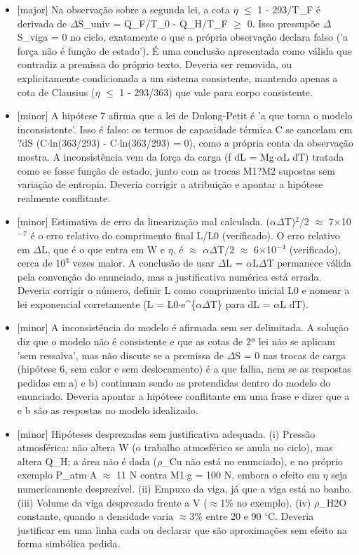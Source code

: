 \documentclass{article}%
\begin{document}
\begin{itemize}%
\item%
{[}major{]} Na observação sobre a segunda lei, a cota $\eta$ $\leq$ 1 - 293/T\_F é derivada de $\Delta$S\_univ = Q\_F/T\_0 - Q\_H/T\_F $\geq$ 0. Isso pressupõe $\Delta$S\_viga = 0 no ciclo, exatamente o que a própria observação declara falso ('a força não é função de estado'). É uma conclusão apresentada como válida que contradiz a premissa do próprio texto. Deveria ser removida, ou explicitamente condicionada a um sistema consistente, mantendo apenas a cota de Clausius ($\eta$ $\leq$ 1 - 293/363) que vale para corpo consistente.%
\item%
{[}minor{]} A hipótese 7 afirma que a lei de Dulong{-}Petit é 'a que torna o modelo inconsistente'. Isso é falso: os termos de capacidade térmica C se cancelam em ?dS (C$\cdot$ln(363/293) - C$\cdot$ln(363/293) = 0), como a própria conta da observação mostra. A inconsistência vem da força da carga (f dL = Mg$\cdot$$\alpha$L dT) tratada como se fosse função de estado, junto com as trocas M1?M2 supostas sem variação de entropia. Deveria corrigir a atribuição e apontar a hipótese realmente conflitante.%
\item%
{[}minor{]} Estimativa de erro da linearização mal calculada. ($\alpha$$\Delta$T)$^2$/2 $\approx$ 7$\times$10$^{-}$$^{7}$ é o erro relativo do comprimento final L/L0 (verificado). O erro relativo em $\Delta$L, que é o que entra em W e $\eta$, é $\approx$ $\alpha$$\Delta$T/2 $\approx$ 6$\times$10$^{-}$$^{4}$ (verificado), cerca de 10$^3$ vezes maior. A conclusão de usar $\Delta$L = $\alpha$L$\Delta$T permanece válida pela convenção do enunciado, mas a justificativa numérica está errada. Deveria corrigir o número, definir L como comprimento inicial L0 e nomear a lei exponencial corretamente (L = L0$\cdot$e\^{}\{$\alpha$$\Delta$T\} para dL = $\alpha$L dT).%
\item%
{[}minor{]} A inconsistência do modelo é afirmada sem ser delimitada. A solução diz que o modelo não é consistente e que as cotas de 2ª lei não se aplicam 'sem ressalva', mas não discute se a premissa de $\Delta$S = 0 nas trocas de carga (hipótese 6, sem calor e sem deslocamento) é a que falha, nem se as respostas pedidas em a) e b) continuam sendo as pretendidas dentro do modelo do enunciado. Deveria apontar a hipótese conflitante em uma frase e dizer que a e b são as respostas no modelo idealizado.%
\item%
{[}minor{]} Hipóteses desprezadas sem justificativa adequada. (i) Pressão atmosférica: não altera W (o trabalho atmosférico se anula no ciclo), mas altera Q\_H; a área não é dada ($\rho$\_Cu não está no enunciado), e no próprio exemplo P\_atm$\cdot$A $\approx$ 11 N contra M1$\cdot$g = 100 N, embora o efeito em $\eta$ seja numericamente desprezível. (ii) Empuxo da viga, já que a viga está no banho. (iii) Volume da viga desprezado frente a V ($\approx$1\% no exemplo). (iv) $\rho$\_H2O constante, quando a densidade varia $\approx$3\% entre 20 e 90 $^\circ$C. Deveria justificar em uma linha cada ou declarar que são aproximações sem efeito na forma simbólica pedida.%

\end{itemize}
\end{document}
